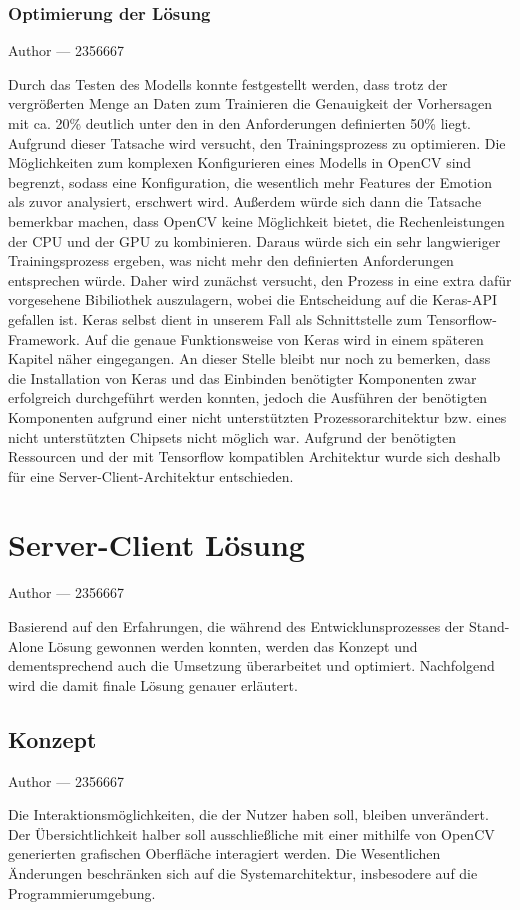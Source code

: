 \documentclass[12pt, a4paper]{report}
\makeatletter
\newcommand{\sectionauthor}[1]{%
  {\parindent0pt\vspace*{-5pt}%
  \large{Author --- }
  \linespread{1.1}\large\scshape#1%
  \par\nobreak\vspace*{35pt} }
  \@afterheading%
}
\newcommand{\chapterauthor}[1]{%
  {\parindent0pt\vspace*{-25pt}%
  \large{Author --- }
  \linespread{1.1}\large\scshape#1%
  \par\nobreak\vspace*{35pt} }
  \@afterheading%
}
\makeatother
\begin{document}
\subsection{Optimierung der Lösung}
\sectionauthor{2356667}
Durch das Testen des Modells konnte festgestellt werden, dass trotz der vergrößerten Menge an Daten zum Trainieren die Genauigkeit der Vorhersagen mit ca. 20\% deutlich unter den in den Anforderungen definierten 50\% liegt. Aufgrund dieser Tatsache wird versucht, den Trainingsprozess zu optimieren. Die Möglichkeiten zum komplexen Konfigurieren eines Modells in OpenCV sind begrenzt, sodass eine Konfiguration, die wesentlich mehr Features der Emotion als zuvor analysiert, erschwert wird. Außerdem würde sich dann die Tatsache bemerkbar machen, dass OpenCV keine Möglichkeit bietet, die  Rechenleistungen der CPU und der GPU zu kombinieren. Daraus würde sich ein sehr langwieriger Trainingsprozess ergeben, was nicht mehr den definierten Anforderungen entsprechen würde. Daher wird zunächst versucht, den Prozess in eine extra dafür vorgesehene Bibiliothek auszulagern, wobei die Entscheidung auf die Keras-API gefallen ist. Keras selbst dient in unserem Fall als Schnittstelle zum Tensorflow-Framework. Auf die genaue Funktionsweise von Keras wird in einem späteren Kapitel näher eingegangen. An dieser Stelle bleibt nur noch zu bemerken, dass die Installation von Keras und das Einbinden benötigter Komponenten zwar erfolgreich durchgeführt werden konnten, jedoch die Ausführen der benötigten Komponenten aufgrund einer nicht unterstützten Prozessorarchitektur bzw. eines nicht unterstützten Chipsets nicht möglich war. Aufgrund der benötigten Ressourcen und der mit Tensorflow kompatiblen Architektur wurde sich deshalb für eine Server-Client-Architektur entschieden.

\chapter{Server-Client Lösung}
\chapterauthor{2356667}
Basierend auf den Erfahrungen, die während des Entwicklunsprozesses der Stand-Alone Lösung gewonnen werden konnten, werden das Konzept und dementsprechend auch die Umsetzung überarbeitet und optimiert. Nachfolgend wird die damit finale Lösung genauer erläutert.

\section{Konzept}
\sectionauthor{2356667}
Die Interaktionsmöglichkeiten, die der Nutzer haben soll, bleiben unverändert. Der Übersichtlichkeit halber soll ausschließliche mit einer mithilfe von OpenCV generierten grafischen Oberfläche interagiert werden. Die Wesentlichen Änderungen beschränken sich auf die Systemarchitektur, insbesodere auf die Programmierumgebung.
\end{document}
